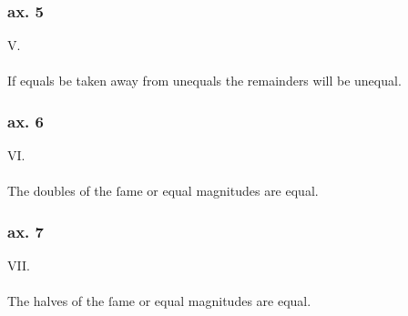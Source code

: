\begin{minipage}{0.67\textwidth}
    \subsubsection{ax. 5}
    \begin{center}
        V.\label{ax5}\\
        \hfill\\
        If equals be taken away from unequals the remainders will be \mbox{unequal}.
    \end{center}
    \subsubsection{ax. 6}
    \begin{center}
        VI.\label{ax6}\\
        \hfill\\
        The doubles of the ſame or equal magnitudes are equal.\\
    \end{center}
    \subsubsection{ax. 7}
    \begin{center}
        VII.\label{ax7}\\
        \hfill\\
        The halves of the ſame or equal magnitudes are equal.\\
    \end{center}
\end{minipage}

\pagebreak


